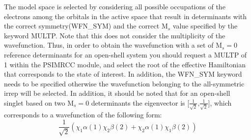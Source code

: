 The model space is selected by considering all possible occupations of the electrons among the orbitals in the active space that result in determinants with the correct symmetry(WFN\_SYM) and the correct $\textrm{M}_s$ value specified by the keyword MULTP. Note that this does not consider the multiplicity of the wavefunction. Thus, in order to obtain the wavefunction with a set of $\textrm{M}_s = 0$ reference determinants for an open-shell system you should request a MULTP of 1 within the PSIMRCC module, and select the root of the effective Hamiltonian that corresponds to the state of interest. In addition, the WFN\_SYM keyword needs to be specified otherwise the wavefunction belonging to the all-symmetric irrep will be selected. In addition, it should be noted that for an open-shell singlet based on two $\textrm{M}_s = 0$ determinants the eigenvector is [$\frac{1}{\sqrt{2}}\text{,}\frac{1}{\sqrt{2}}$], which corresponds to a wavefunction of the following form:
\begin{equation*}
\frac{1}{\sqrt{2}} \left( \chi_1 \alpha (1) \chi_2 \beta (2) + \chi_2 \alpha(1) \chi_1 \beta (2) \right)
\end{equation*}  

